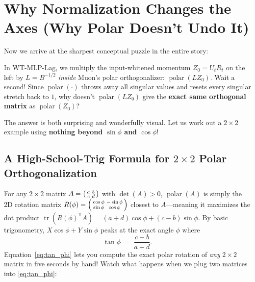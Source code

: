 \documentclass[11pt]{article}
\newcommand{\Tr}{{\mathsf{T}}}
\newcommand{\tr}{\operatorname{tr}}
\newcommand{\polar}{\operatorname{polar}}
\newcommand{\mname}[1]{#1}
\begin{document}
\section{Why Normalization Changes the Axes (Why Polar Doesn't Undo It)}
\label{sec:hijacking}

Now we arrive at the sharpest conceptual puzzle in the entire story:

\begin{plainquestion}
In \mname{WT-MLP-Lag}, we multiply the input-whitened momentum $Z_0 = U_t R_t$ on the left by $L = B^{-1/2}$ \emph{inside} \mname{Muon}'s polar orthogonalizer: $\polar(L Z_0)$.
Wait a second! Since $\polar(\cdot)$ throws away all singular values and resets every singular stretch back to $1$, why doesn't $\polar(L Z_0)$ give the \textbf{exact same orthogonal matrix} as $\polar(Z_0)$?
\end{plainquestion}

The answer is both surprising and wonderfully visual. Let us work out a $2\times 2$ example using \textbf{nothing beyond $\sin\phi$ and $\cos\phi$}!

\subsection{A High-School-Trig Formula for \texorpdfstring{$2\times 2$}{2x2} Polar Orthogonalization}
\label{sec:2x2_trig}

For any $2\times 2$ matrix $A = \begin{psmallmatrix} a & b \\ c & d \end{psmallmatrix}$ with $\det(A) > 0$, $\polar(A)$ is simply the 2D rotation matrix $R(\phi) = \begin{psmallmatrix} \cos\phi & -\sin\phi \\ \sin\phi & \cos\phi \end{psmallmatrix}$ closest to $A$---meaning it maximizes the dot product $\tr(R(\phi)^{\Tr} A) = (a+d)\cos\phi + (c-b)\sin\phi$.
By basic trigonometry, $X\cos\phi + Y\sin\phi$ peaks at the exact angle $\phi$ where
\begin{equation}
  \tan\phi \;=\; \frac{c - b}{a + d}.
  \label{eq:tan_phi}
\end{equation}
Equation~\eqref{eq:tan_phi} lets you compute the exact polar rotation of \emph{any} $2\times 2$ matrix in five seconds by hand! Watch what happens when we plug two matrices into \eqref{eq:tan_phi}:
\end{document}
